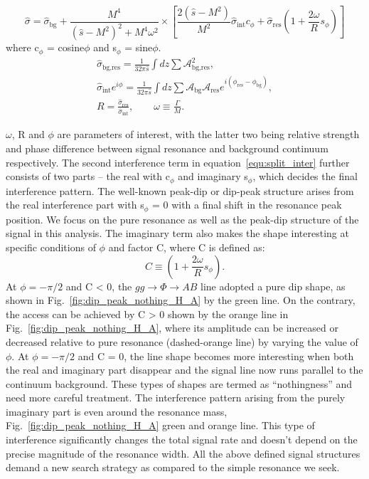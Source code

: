 \begin{equation}\label{equ:split_inter}
\hat{\sigma}=\hat{\sigma}_{\text{bg}}+\frac{M^{4}}{\left(\hat{s}-M^{2}\right)^{2}+M^{4}\omega^{2}}\times\left[\frac{2\left(\hat{s}-M^{2}\right)}{M^{2}}\hat{\sigma}_{\text{int}}c_{\phi}+\hat{\sigma}_{\text{res}}\left(1+\frac{2\omega}{R}s_{\phi} \right) \right]
\end{equation}
where c$_{\phi}$ = cosine$\phi$ and s$_{\phi}$ = sine$\phi$.
\begin{equation}\label{equ:inter_variables}
\begin{split}
\hat{\sigma}_{\text{bg,res}}=\frac{1}{32\pi\hat{s}}\int dz \sum \mathcal{A}^{2}_{\text{bg,res}},\\
\hat{\sigma}_{\text{int}}e^{i\phi}=\frac{1}{32\pi\hat{s}}\int dz \sum \mathcal{A}_{\text{bg}}\mathcal{A}_{\text{res}}e^{i\left(\phi_{\text{res}}-\phi_{\text{bg}}\right)},\\
R=\frac{\hat{\sigma}_{\text{res}}}{\hat{\sigma}_{\text{int}}},\qquad \omega \equiv \frac{\Gamma}{M}.
\end{split}
\end{equation}

$\omega$, R and  $\phi$ are parameters of interest, with the latter two being relative strength and phase difference between signal resonance and background continuum respectively. The second interference term in equation~\ref{equ:split_inter} further consists of two parts – the real with $\text{c}_{\phi}$ and imaginary s$_{\phi}$, which decides the final interference pattern. The well-known peak-dip or dip-peak structure arises from the real interference part with s$_{\phi}$ = 0 with a final shift in the resonance peak position. We focus on the pure resonance as well as the peak-dip structure of the signal in this analysis. The imaginary term also makes the shape interesting at specific conditions of $\phi$ and factor C, where C is defined as:
\begin{equation}\label{equ:correction_term}
C \equiv \left(1+\frac{2\omega}{R}s_{\phi} \right).
\end{equation} 
At $\phi=-\pi /2$ and C < 0, the $gg\rightarrow\Phi\rightarrow AB$ line adopted a pure dip shape, as shown in Fig.~\ref{fig:dip_peak_nothing_H_A} by the green line. On the contrary, the access can be achieved by C > 0 shown by the orange line in Fig.~\ref{fig:dip_peak_nothing_H_A}, where its amplitude can be increased or decreased relative to pure resonance (dashed-orange line) by varying the value of $\phi$. At $\phi=-\pi /2$ and C = 0, the line shape becomes more interesting when both the real and imaginary part disappear and the signal line now runs parallel to the continuum background. These types of shapes are termed as ``nothingness'' and need more careful treatment. The interference pattern arising from the purely imaginary part is even around the resonance mass, Fig.~\ref{fig:dip_peak_nothing_H_A} green and orange line. This type of interference significantly changes the total signal rate and doesn't depend on the precise magnitude of the resonance width. All the above defined signal structures demand a new search strategy as compared to the simple resonance we seek. 


